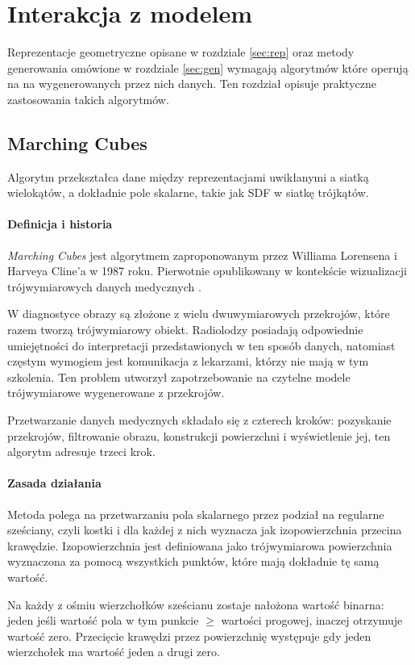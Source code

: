 \section{Interakcja z modelem}
\label{sec:int}
Reprezentacje geometryczne opisane w rozdziale \ref{sec:rep} oraz metody generowania omówione w rozdziale \ref{sec:gen} wymagają algorytmów które operują na na wygenerowanych przez nich danych. Ten rozdział opisuje praktyczne zastosowania takich algorytmów.

\subsection{Marching Cubes}
\label{sec:mar}
Algorytm przekształca dane między reprezentacjami uwikłanymi a siatką wielokątów, a dokładnie pole skalarne, takie jak SDF w siatkę trójkątów.

\paragraph{Definicja i historia}
\textit{Marching Cubes} jest algorytmem zaproponowanym przez Williama Lorensena i Harveya Cline'a w 1987 roku. Pierwotnie opublikowany w kontekście wizualizacji trójwymiarowych danych medycznych \cite{lorensen1987}.

W diagnostyce obrazy są złożone z wielu dwuwymiarowych przekrojów, które razem tworzą trójwymiarowy obiekt. Radiolodzy posiadają odpowiednie umiejętności do interpretacji przedstawionych w ten sposób danych, natomiast częstym wymogiem jest komunikacja z lekarzami, którzy nie mają w tym szkolenia. Ten problem utworzył zapotrzebowanie na czytelne modele trójwymiarowe wygenerowane z przekrojów. 

Przetwarzanie danych medycznych składało się z czterech kroków: pozyskanie przekrojów, filtrowanie obrazu, konstrukcji powierzchni i wyświetlenie jej, ten algorytm adresuje trzeci krok.

\paragraph{Zasada działania}
Metoda polega na przetwarzaniu pola skalarnego przez podział na regularne sześciany, czyli kostki i dla każdej z nich wyznacza jak izopowierzchnia przecina krawędzie. Izopowierzchnia jest definiowana jako trójwymiarowa powierzchnia wyznaczona za pomocą wszystkich punktów, które mają dokładnie tę samą wartość. 

Na każdy z ośmiu wierzchołków sześcianu zostaje nałożona wartość binarna: jeden jeśli wartość pola w tym punkcie $\ge$ wartości progowej, inaczej otrzymuje wartość zero. Przecięcie krawędzi przez powierzchnię występuje gdy jeden wierzchołek ma wartość jeden a drugi zero.

